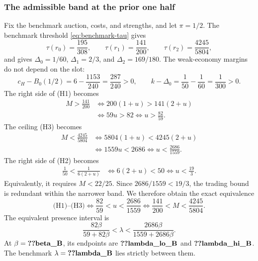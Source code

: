 \subsubsection{The admissible band at the prior one half}\label{sec:benchmark-band}
Fix the benchmark auction, costs, and strengths, and let $\pi=1/2$.
The benchmark threshold \eqref{eq:benchmark-tau} gives
\[
\tau(r_0)=\frac{195}{308},\qquad
\tau(r_1)=\frac{141}{200},\qquad
\tau(r_2)=\frac{4245}{5804},
\]
and  gives $\Delta_0=1/60$, $\Delta_1=2/3$, and $\Delta_2=169/180$.
The weak-economy margins do not depend on the slot:
\[
c_H-B_0(1/2)=6-\frac{1153}{240}=\frac{287}{240}>0,\qquad
k-\Delta_0=\frac1{50}-\frac1{60}=\frac1{300}>0.
\]
The right side of (H1) becomes
\begin{align*}
M>\frac{141}{200}
&\iff 200(1+u)>141(2+u)\\
&\iff 59u>82
\iff u>\frac{82}{59}.
\end{align*}
The ceiling (H3) becomes
\begin{align*}
M<\frac{4245}{5804}
&\iff5804(1+u)<4245(2+u)\\
&\iff1559u<2686
\iff u<\frac{2686}{1559}.
\end{align*}
The right side of (H2) becomes
\begin{align*}
\frac1{50}<\frac1{6(2+u)}
&\iff6(2+u)<50
\iff u<\frac{19}{3}.
\end{align*}
Equivalently, it requires $M<22/25$.
Since $2686/1559<19/3$, the trading bound is redundant within the narrower band.
We therefore obtain the exact equivalence
\[
\text{(H1)--(H3)}
\iff \frac{82}{59}<u<\frac{2686}{1559}
\iff \frac{141}{200}<M<\frac{4245}{5804}.
\]
The equivalent presence interval is
\[
\frac{82\beta}{59+82\beta}<\lambda<\frac{2686\beta}{1559+2686\beta}.
\]
At $\beta=\reg{beta_B}$, its endpoints are $\reg{lambda_lo_B}$ and $\reg{lambda_hi_B}$.
The benchmark $\lambda=\reg{lambda_B}$ lies strictly between them.

